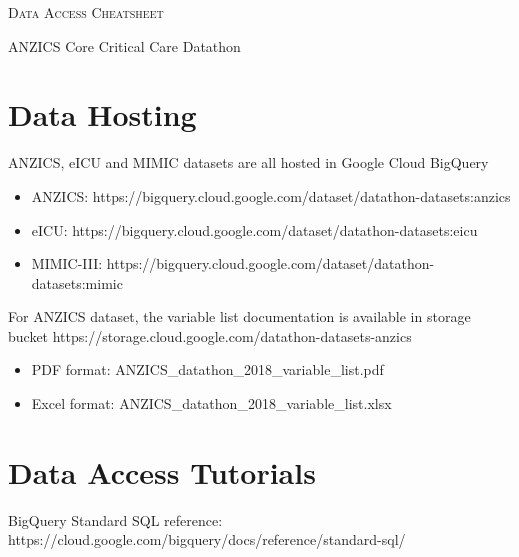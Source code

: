\begin{center}

\begin{huge}
\textsc{Data Access Cheatsheet}
\end{huge}

\vspace{3mm}

\begin{Large}
ANZICS Core Critical Care Datathon
\end{Large}
\end{center}

\section*{Data Hosting}

ANZICS, eICU and MIMIC datasets are all hosted in Google Cloud BigQuery

\begin{itemize}
\item ANZICS: https://bigquery.cloud.google.com/dataset/datathon-datasets:anzics
\item eICU: https://bigquery.cloud.google.com/dataset/datathon-datasets:eicu
\item MIMIC-III: https://bigquery.cloud.google.com/dataset/datathon-datasets:mimic
\end{itemize}

\noindent
For ANZICS dataset, the variable list documentation is available in storage
bucket https://storage.cloud.google.com/datathon-datasets-anzics
\begin{itemize}
\item PDF format: ANZICS\_datathon\_2018\_variable\_list.pdf
\item Excel format: ANZICS\_datathon\_2018\_variable\_list.xlsx
\end{itemize}

\section*{Data Access Tutorials}

BigQuery Standard SQL reference: https://cloud.google.com/bigquery/docs/reference/standard-sql/

